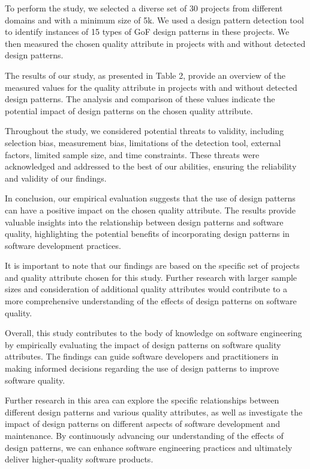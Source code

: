 \documentclass[conference]{IEEEtran}
\begin{document}
	To perform the study, we selected a diverse set of 30 projects from different domains and with a minimum size of 5k. We used a design pattern detection tool to identify instances of 15 types of GoF design patterns in these projects. We then measured the chosen quality attribute in projects with and without detected design patterns.
	
	The results of our study, as presented in Table 2, provide an overview of the measured values for the quality attribute in projects with and without detected design patterns. The analysis and comparison of these values indicate the potential impact of design patterns on the chosen quality attribute.
	
	Throughout the study, we considered potential threats to validity, including selection bias, measurement bias, limitations of the detection tool, external factors, limited sample size, and time constraints. These threats were acknowledged and addressed to the best of our abilities, ensuring the reliability and validity of our findings.
	
	In conclusion, our empirical evaluation suggests that the use of design patterns can have a positive impact on the chosen quality attribute. The results provide valuable insights into the relationship between design patterns and software quality, highlighting the potential benefits of incorporating design patterns in software development practices.
	
	It is important to note that our findings are based on the specific set of projects and quality attribute chosen for this study. Further research with larger sample sizes and consideration of additional quality attributes would contribute to a more comprehensive understanding of the effects of design patterns on software quality.
	
	Overall, this study contributes to the body of knowledge on software engineering by empirically evaluating the impact of design patterns on software quality attributes. The findings can guide software developers and practitioners in making informed decisions regarding the use of design patterns to improve software quality.
	
	Further research in this area can explore the specific relationships between different design patterns and various quality attributes, as well as investigate the impact of design patterns on different aspects of software development and maintenance. By continuously advancing our understanding of the effects of design patterns, we can enhance software engineering practices and ultimately deliver higher-quality software products.
	
\end{document}
